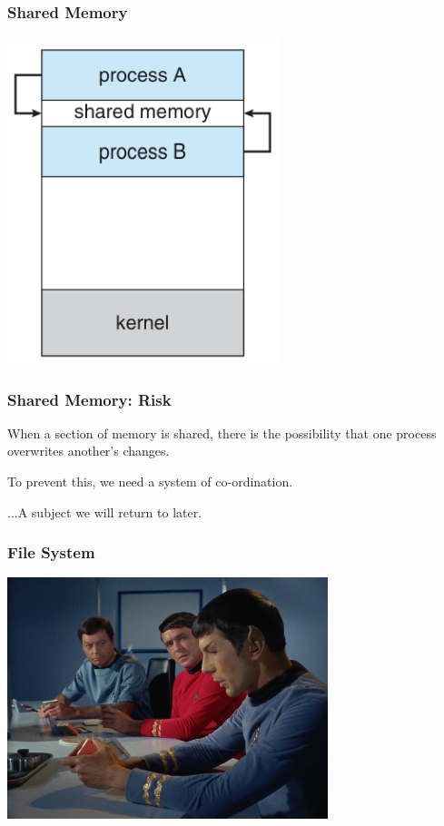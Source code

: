 \begin{frame}
	\frametitle{Shared Memory}

	\begin{center}
		\includegraphics[width=0.6\textwidth]{images/shared-memory.png}
	\end{center}

\end{frame}

\begin{frame}
	\frametitle{Shared Memory: Risk}

	When a section of memory is shared, there is the possibility that one process overwrites another's changes.

	To prevent this, we need a system of co-ordination.

	...A subject we will return to later.

\end{frame}


\begin{frame}
	\frametitle{File System}

	\begin{center}
		\includegraphics[width=0.7\textwidth]{images/datatape.jpg}
	\end{center}

\end{frame}


